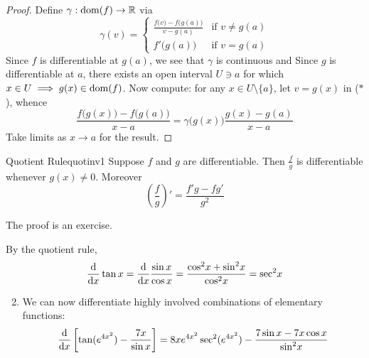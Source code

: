\begin{proof}
Define $\gamma:\operatorname{dom}(f)\to\mathbb{R}$ via
\[\gamma(v)=\begin{cases}
\frac{f\big(v\big)-f\big(g(a)\big)}{v-g(a)}&\text{if }v\neq g(a)\\
f'\big(g(a)\big)&\text{if }v=g(a)
\end{cases} \tag{$\ast$}\]
Since $f$ is differentiable at $g(a)$, we see that $\gamma$ is continuous and \medbreak
Since $g$ is differentiable at $a$, there exists an open interval $U\ni a$ for which $x\in U\implies g(x)\in\operatorname{dom}(f)$.\smallbreak
Now compute: for any $x\in U\setminus\{a\}$, let $v=g(x)$ in ($\ast$), whence
\[\frac{f\big(g(x)\big)-f\big(g(a)\big)}{x-a}=\gamma\bigl(g(x)\bigr)\frac{g(x)-g(a)}{x-a}\]
Take limits as $x\to a$ for the result.
\end{proof}

\begin{cor}{Quotient Rule}{quotinv1}
Suppose $f$ and $g$ are differentiable. Then $\frac fg$ is differentiable whenever $g(x)\neq 0$. Moreover
\[\left(\frac fg\right)'=\frac{f'g-fg'}{g^2}\]
\end{cor}

The proof is an exercise.






\begin{examples}{}{}
\exstart By the quotient rule,
	\[\frac{\mathrm{d} }{\mathrm{d} x}\tan x=\frac{\mathrm{d} }{\mathrm{d} x}\frac{\sin x}{\cos x}=\frac{\cos^2\!x+\sin^2\!x}{\cos^2\!x}=\sec^2\!x\]
\begin{enumerate}\setcounter{enumi}{1}
	\item We can now differentiate highly involved combinations of elementary functions:
	\[\frac{\mathrm{d} }{\mathrm{d} x}\left[\tan(e^{4x^2})-\frac{7x}{\sin x}\right]=8xe^{4x^2}\sec^2(e^{4x^2})-\frac{7\sin x-7x\cos x}{\sin^2\!x}\]
\end{enumerate}
\end{examples}

\vfil

